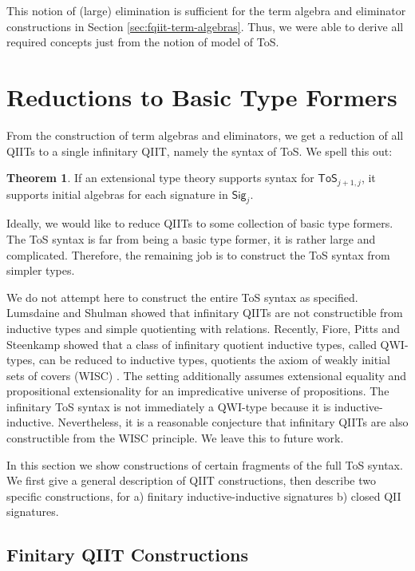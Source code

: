 \documentclass[12pt,a4paper,twoside,openany]{book}
\theoremstyle{remark}
\theoremstyle{definition}
\theoremstyle{theorem}
\newtheorem{theorem}{Theorem}
\newcommand{\ToS}{\mathsf{ToS}}
\newcommand{\Sig}{\mathsf{Sig}}
\begin{document}
This notion of (large) elimination is sufficient for the term algebra and
eliminator constructions in Section \ref{sec:fqiit-term-algebras}. Thus, we were
able to derive all required concepts just from the notion of model of ToS.

\section{Reductions to Basic Type Formers}
\label{sec:finitary-reductions}

From the construction of term algebras and eliminators, we get a reduction of
all QIITs to a single infinitary QIIT, namely the syntax of ToS. We spell this out:

\begin{theorem} If an extensional type theory supports syntax for $\ToS_{j+1,j}$, it supports
initial algebras for each signature in $\Sig_j$.
\end{theorem}

Ideally, we would like to reduce QIITs to some collection of basic type
formers. The ToS syntax is far from being a basic type former, it is rather
large and complicated. Therefore, the remaining job is to construct the ToS
syntax from simpler types.

We do not attempt here to construct the entire ToS syntax as specified.
Lumsdaine and Shulman \cite[Section 9]{lumsdaineShulman} showed that infinitary
QIITs are not constructible from inductive types and simple quotienting with
relations. Recently, Fiore, Pitts and Steenkamp showed that a class of
infinitary quotient inductive types, called QWI-types, can be reduced to
inductive types, quotients the axiom of weakly initial sets of covers (WISC)
\cite{DBLP:journals/corr/abs-2101-02994}. The setting additionally assumes
extensional equality and propositional extensionality for an impredicative
universe of propositions. The infinitary ToS syntax is not immediately a
QWI-type because it is inductive-inductive.  Nevertheless, it is a reasonable
conjecture that infinitary QIITs are also constructible from the WISC
principle. We leave this to future work.

In this section we show constructions of certain fragments of the full ToS
syntax. We first give a general description of QIIT constructions, then describe
two specific constructions, for a) finitary inductive-inductive signatures b)
closed QII signatures.

\subsection{Finitary QIIT Constructions}
\label{sec:fqiit-constructions}
\end{document}
